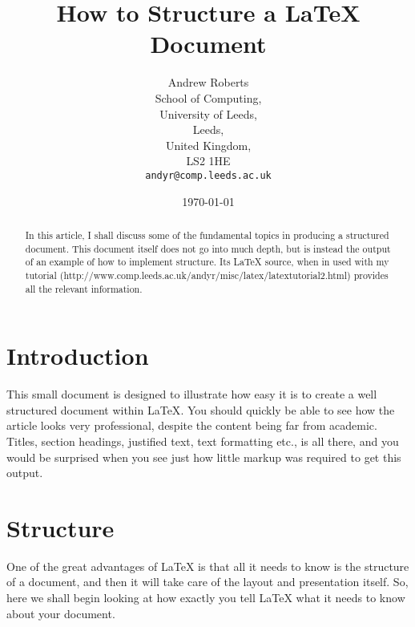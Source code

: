 \documentclass{article}
\begin{document}
    \title{How to Structure a \LaTeX{} Document} %
    \author{Andrew Roberts\\
    School of Computing,\\
    University of Leeds,\\
    Leeds,\\
    United Kingdom,\\
    LS2 1HE\\
    \texttt{andyr@comp.leeds.ac.uk}}  %
    \date{\today}  %
    \maketitle

    \begin{abstract}
        In this article, I shall discuss some of the fundamental topics in
        producing a structured document.  This document itself does not go into
        much depth, but is instead the output of an example of how to implement
        structure. Its \LaTeX{} source, when in used with my tutorial
        (http://www.comp.leeds.ac.uk/andyr/misc/latex/\-latextutorial2.html)
        provides all the relevant information.  \end{abstract}

    \section{Introduction}
    This small document is designed to illustrate how easy it is to create a
    well structured document within \LaTeX\cite{lamport94}.  You should quickly be able to
    see how the article looks very professional, despite the content being
    far from academic.  Titles, section headings, justified text, text
    formatting etc., is all there, and you would be surprised when you see
    just how little markup was required to get this output.

    \section{Structure}
    One of the great advantages of \LaTeX{} is that all it needs to know is
    the structure of a document, and then it will take care of the layout
    and presentation itself.  So, here we shall begin looking at how exactly
    you tell \LaTeX{} what it needs to know about your document.
\end{document}
